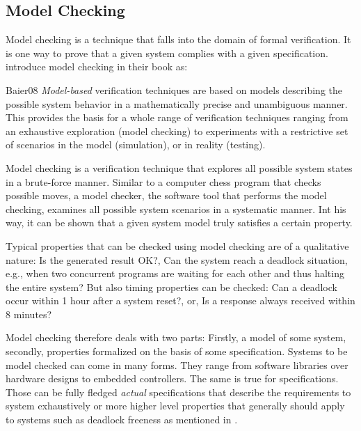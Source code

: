 \subsection{Model Checking}

Model checking is a technique that falls into the domain of formal verification.
It is one way to prove that a given system complies with a given specification.
\citeauthor{Baier08} introduce model checking in their book  \cite{Baier08} as:
\begin{displaycquote}[p.7ff.]{Baier08}
    \textit{Model-based} verification techniques are based on models describing the possible system behavior in a mathematically precise and unambiguous manner. \textelp{}
    This provides the basis for a whole range of verification techniques ranging from an exhaustive exploration (model checking) to experiments with a restrictive set of scenarios in the model (simulation), or in reality (testing). \textelp{}

    Model checking is a verification technique that explores all possible system states in a brute-force manner.
    Similar to a computer chess program that checks possible moves, a model checker, the software tool that performs the model checking, examines all possible system scenarios in a systematic manner.
    Int his way, it can be shown that a given system model truly satisfies a certain property. \textelp{}

    Typical properties that can be checked using model checking are of a qualitative nature:
    Is the generated result OK?,
    Can the system reach a deadlock situation, e.g., when two concurrent programs are waiting for each other and thus halting the entire system?
    But also timing properties can be checked:
    Can a deadlock occur within 1 hour after a system reset?, or, Is a response always received within 8 minutes?
\end{displaycquote}

Model checking therefore deals with two parts: Firstly, a model of some system, secondly, properties formalized on the basis of some specification.
Systems to be model checked can come in many forms.
They range from software libraries over hardware designs to embedded controllers.
The same is true for specifications.
Those can be fully fledged \textit{actual} specifications that describe the requirements to system exhaustively or more higher level properties that generally should apply to systems such as deadlock freeness as mentioned in \cite{Baier08}.

